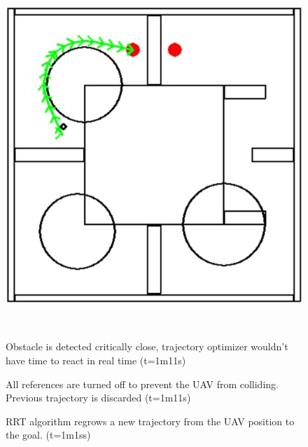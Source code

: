 \begin{figure}[!htb]
\begin{minipage}[b]{.3\linewidth}
        \centering
        \includegraphics[width=0.8\linewidth]{Figures/07_simulation/basic/14basic.png}
    \end{minipage}\\[-7pt]
    \begin{minipage}[t]{.3\linewidth}
    \caption{Obstacle is detected critically close, trajectory optimizer wouldn't have time to react in real time (t=1m11s)}
    \label{fig:basic12}
    \end{minipage}%
    \hfill%
    \begin{minipage}[t]{.3\linewidth}
    \caption{All references are turned off to prevent the UAV from colliding. Previous trajectory is discarded (t=1m11s)}
    \label{fig:basic13}
    \end{minipage}%
    \hfill%
    \begin{minipage}[t]{.3\linewidth}
    \caption{RRT algorithm regrows a new trajectory from the UAV position to the goal. (t=1m1ss)}
    \label{fig:basic14}
    \end{minipage}%
\end{figure}


